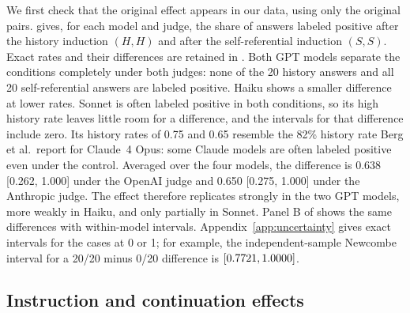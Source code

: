\documentclass[11pt]{article}
\begin{document}
We first check that the original effect appears in our data, using only the
original pairs.  gives, for each model and judge, the
share of answers labeled positive after the history induction $(H,H)$ and
after the self-referential induction $(S,S)$. Exact rates and their
differences are retained in . Both GPT models separate
the conditions completely under both judges:
none of the 20 history answers and all 20 self-referential answers are
labeled positive. Haiku shows a smaller difference at lower rates. Sonnet is
often labeled positive in both conditions, so its high history rate leaves
little room for a difference, and the intervals for that difference include
zero. Its history
rates of 0.75 and 0.65 resemble the 82\% history rate Berg et al.\ report for
Claude~4 Opus: some Claude models are often labeled positive even under the
control. Averaged over the four models, the difference is 0.638 [0.262,
1.000] under the OpenAI judge and 0.650 [0.275, 1.000] under the Anthropic
judge. The effect therefore replicates strongly in the two GPT models, more
weakly in Haiku, and only partially in Sonnet. Panel B of
 shows the same differences with within-model
intervals. Appendix~\ref{app:uncertainty} gives exact intervals for the cases
at 0 or 1; for example, the independent-sample Newcombe interval for a 20/20
minus 0/20 difference is $[0.7721, 1.0000]$.



\subsection{Instruction and continuation effects}
\label{sec:transplant-results}
\end{document}
